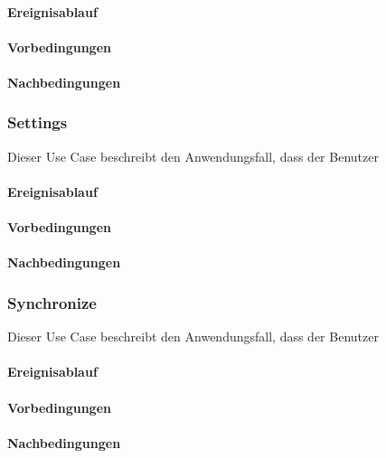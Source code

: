 			\paragraph{Ereignisablauf}
	
			\paragraph{Vorbedingungen}
			
			\paragraph{Nachbedingungen}
	
		\subsubsection{Settings}
			Dieser Use Case beschreibt den Anwendungsfall, dass der Benutzer 
			
			\paragraph{Ereignisablauf}
	
			\paragraph{Vorbedingungen}
			
			\paragraph{Nachbedingungen}
	
		\subsubsection{Synchronize}
			Dieser Use Case beschreibt den Anwendungsfall, dass der Benutzer 
			
			\paragraph{Ereignisablauf}
	
			\paragraph{Vorbedingungen}
			
			\paragraph{Nachbedingungen}
	
